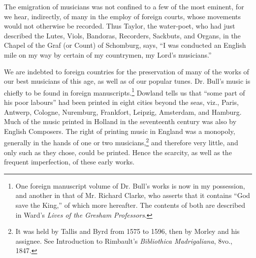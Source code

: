 The emigration of musicians was not confined to a few of the most eminent, for
we hear, indirectly, of many in the employ of foreign courts, whose movements
would not otherwise be recorded. Thus Taylor, the water-poet, who had just
described the Lutes, Viols, Bandoras, Recorders, Sackbuts, and Organs, in the
Chapel of the Graf (or Count) of Schomburg, says, “I was conducted an English
mile on my way by certain of my countrymen, my Lord’s musicians.”

We are indebted to foreign countries for the preservation of many of the works
of our best musicians of this age, as well as of our popular tunes. Dr. Bull’s
music is chiefly to be found in foreign manuscripts.\footnote{\textit{}
One foreign manuscript volume of Dr. Bull’s works
is now in my possession, and another in that of Mr.
Richard Clarke, who asserts that it contains “God save
the King,” of which more hereafter. The contents of
both are described in Ward’s \textit{Lives of the Gresham Professors}.
}
Dowland tells us that “some
part of his poor labours” had been printed in eight cities beyond the seas, viz.,
Paris, Antwerp, Cologne, Nuremburg, Frankfort, Leipzig, Amsterdam, and Hamburg. 
Much of the music printed in Holland in the seventeenth century was also
by English Composers. The right of printing music in England was a monopoly,
generally in the hands of one or two musicians,\footnote{\textit{}
It was held by Tallis and Byrd from 1575 to 1596, then
by Morley and his assignee. See Introduction to Rimbault’s \textit{Bibliothica Madrigaliana}, 8vo., 1847.}
and therefore very little, and
only such as they chose, could be printed. Hence the scarcity, as well as the
frequent imperfection, of these early works.


